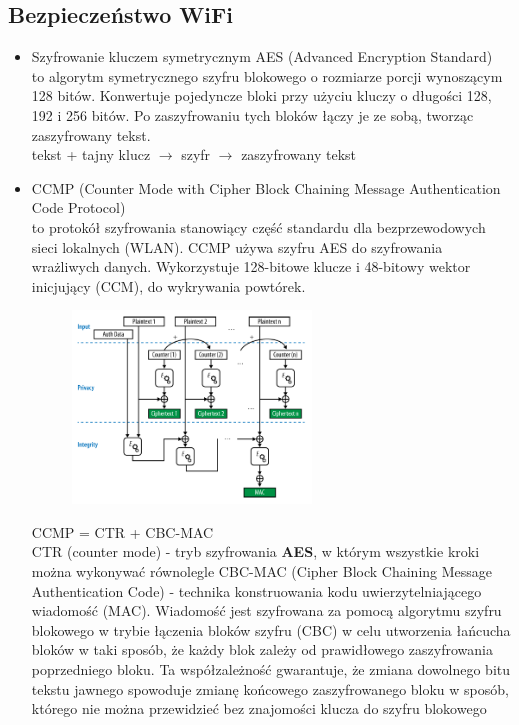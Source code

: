 \documentclass[]{article}
\begin{document}
\subsection{Bezpieczeństwo WiFi}
\begin{itemize}
    \item Szyfrowanie kluczem symetrycznym AES (Advanced Encryption Standard) \\
    to algorytm symetrycznego szyfru blokowego o rozmiarze porcji wynoszącym 128 bitów. Konwertuje pojedyncze bloki przy użyciu kluczy o długości 128, 192 i 256 bitów. Po zaszyfrowaniu tych bloków łączy je ze sobą, tworząc zaszyfrowany tekst. \\
    tekst + tajny klucz $\rightarrow$ szyfr $\rightarrow$ zaszyfrowany tekst
    \item CCMP (Counter Mode with Cipher Block Chaining Message Authentication Code Protocol) \\
    to protokół szyfrowania stanowiący część standardu dla bezprzewodowych sieci lokalnych (WLAN). CCMP używa szyfru AES do szyfrowania wrażliwych danych. Wykorzystuje 128-bitowe klucze i 48-bitowy wektor inicjujący (CCM), do wykrywania powtórek. \\
    \begin{figure}[H]
        \centering
        \includegraphics[width=0.6\textwidth]{CCMP.png}
    \end{figure}
    CCMP = CTR + CBC-MAC \\
    CTR (counter mode) - tryb szyfrowania \textbf{AES}, w którym wszystkie kroki można wykonywać równolegle
    CBC-MAC (Cipher Block Chaining Message Authentication Code) - technika konstruowania kodu uwierzytelniającego wiadomość (MAC). Wiadomość jest szyfrowana za pomocą algorytmu szyfru blokowego w trybie łączenia bloków szyfru (CBC) w celu utworzenia łańcucha bloków w taki sposób, że każdy blok zależy od prawidłowego zaszyfrowania poprzedniego bloku. Ta współzależność gwarantuje, że zmiana dowolnego bitu tekstu jawnego spowoduje zmianę końcowego zaszyfrowanego bloku w sposób, którego nie można przewidzieć bez znajomości klucza do szyfru blokowego

\end{itemize}
\end{document}
